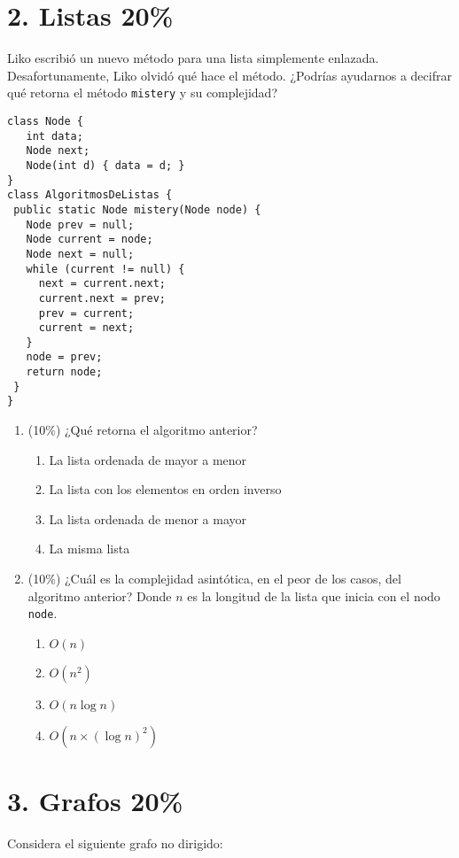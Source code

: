 \documentclass[10 pt]{article}
\begin{document}
\begin{multicols}{2}
\section{2. Listas 20\%}
Liko escribió un nuevo método para una lista simplemente enlazada. Desafortunamente, Liko olvidó
qué hace el método. ¿Podrías ayudarnos a decifrar qué retorna el método \texttt{mistery} y su complejidad?
{\footnotesize
\begin{lstlisting}
class Node { 
   int data; 
   Node next; 
   Node(int d) { data = d; } 
} 
class AlgoritmosDeListas { 
 public static Node mistery(Node node) { 
   Node prev = null; 
   Node current = node; 
   Node next = null; 
   while (current != null) { 
     next = current.next; 
     current.next = prev; 
     prev = current; 
     current = next; 
   } 
   node = prev; 
   return node; 
 }
}
\end{lstlisting}
}
\begin{enumerate}[label=\alph*]
	\item (10\%) ¿Qué retorna el algoritmo anterior?
	\begin{enumerate}[label=\roman*]
		\item La lista ordenada de mayor a menor
		\item La lista con los elementos en orden inverso
		\item La lista ordenada de menor a mayor
		\item La misma lista 
	\end{enumerate}
	\item (10\%) ¿Cuál es la complejidad asintótica, en el peor de los casos, del algoritmo anterior? Donde $n$ es la longitud de la lista que inicia con el nodo \texttt{node}.
	\begin{enumerate}[label=\roman*]
		\item $O(n)$
		\item $O(n^2)$
		\item $O(n\log n)$
		\item $O(n \times (\log n)^2)$
	\end{enumerate}
\end{enumerate}



\section{3. Grafos  20\%}
Considera el siguiente grafo no dirigido:
\begin{center}
		\begin{tikzpicture}
		

\end{tikzpicture}
\end{center}
\end{multicols}
\end{document}
